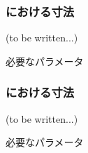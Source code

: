 \subsubsection{\EndFaceBoring における寸法\TBW}
(to be written...)
\begin{Parameter}{必要なパラメータ}
\PMEndFaceBoringWidth
\PMEndFaceBoringCornerR
\PMEndFaceBoringDepth
\PMEndFaceBoringLength\\
\PMACOD
\PMBDOD
\end{Parameter}

\subsubsection{\Inlay における寸法\TBW}
(to be written...)
\begin{Parameter}{必要なパラメータ}
\end{Parameter}


\clearpage

